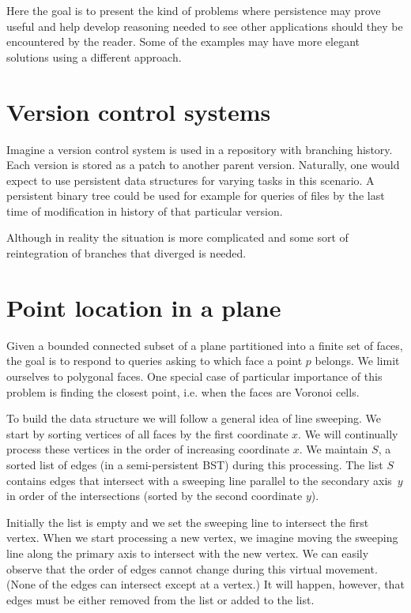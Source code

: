 Here the goal is to present the kind of problems where persistence may prove useful and help develop reasoning needed to see other applications should they be encountered by the reader. 
Some of the examples may have more elegant solutions using a different approach.

\section{Version control systems}

Imagine a version control system is used in a repository with branching history. Each version is stored as a patch to another parent version. Naturally, one would expect to use persistent data structures for varying tasks in this scenario. A persistent binary tree could be used for example for queries of files by the last time of modification in history of that particular version.

Although in reality the situation is more complicated and some sort of reintegration of branches that diverged is needed.

\section{Point location in a plane}

Given a bounded connected subset of a plane partitioned into a finite set of faces, the goal is to respond to queries asking to which face a point $p$ belongs. We limit ourselves to polygonal faces.
One special case of particular importance of this problem is finding the closest point, i.e. when the faces are Voronoi cells.

To build the data structure we will follow a general idea of line sweeping. We start by sorting vertices of all faces by the first coordinate $x$. We will continually process these vertices in the order of increasing coordinate $x$. We maintain $S$, a sorted list of edges (in a semi-persistent BST) during this processing. The list $S$ contains edges that intersect with a sweeping line parallel to the secondary axis~$y$ in order of the intersections (sorted by the second coordinate $y$).

Initially the list is empty and we set the sweeping line to intersect the first vertex.
When we start processing a new vertex, we imagine moving the sweeping line along the primary axis to intersect with the new vertex. We can easily observe that the order of edges cannot change during this virtual movement. (None of the edges can intersect except at a vertex.) It will happen, however, that edges must be either removed from the list or added to the list.

